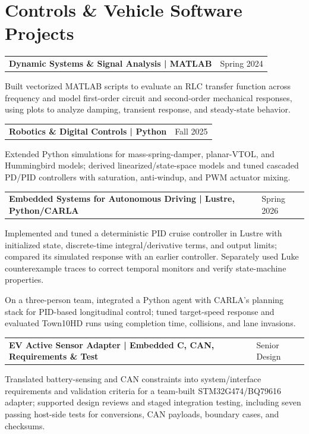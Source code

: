 \documentclass[10pt,letterpaper]{article}
\makeatletter
\newcommand{\resumeentry}[2]{%
  \begin{tabularx}{\textwidth}{@{}X>{\raggedleft\arraybackslash}p{2.40in}@{}}
    \textbf{#1} & #2
  \end{tabularx}\vspace{-0.075cm}
}
\makeatother
\begin{document}
\section{Controls \& Vehicle Software Projects}
\resumeentry{Dynamic Systems \& Signal Analysis | MATLAB}{Spring 2024}
\begin{resumebullets}
  \item Built vectorized MATLAB scripts to evaluate an RLC transfer function across frequency and model first-order circuit and second-order mechanical responses, using plots to analyze damping, transient response, and steady-state behavior.
\end{resumebullets}

\resumeentry{Robotics \& Digital Controls | Python}{Fall 2025}
\begin{resumebullets}
  \item Extended Python simulations for mass-spring-damper, planar-VTOL, and Hummingbird models; derived linearized/state-space models and tuned cascaded PD/PID controllers with saturation, anti-windup, and PWM actuator mixing.
\end{resumebullets}

\resumeentry{Embedded Systems for Autonomous Driving | Lustre, Python/CARLA}{Spring 2026}
\begin{resumebullets}
  \item Implemented and tuned a deterministic PID cruise controller in Lustre with initialized state, discrete-time integral/derivative terms, and output limits; compared its simulated response with an earlier controller. Separately used Luke counterexample traces to correct temporal monitors and verify state-machine properties.
  \item On a three-person team, integrated a Python agent with CARLA's planning stack for PID-based longitudinal control; tuned target-speed response and evaluated Town10HD runs using completion time, collisions, and lane invasions.
\end{resumebullets}

\resumeentry{EV Active Sensor Adapter | Embedded C, CAN, Requirements \& Test}{Senior Design}
\begin{resumebullets}
  \item Translated battery-sensing and CAN constraints into system/interface requirements and validation criteria for a team-built STM32G474/BQ79616 adapter; supported design reviews and staged integration testing, including seven passing host-side tests for conversions, CAN payloads, boundary cases, and checksums.
\end{resumebullets}
\end{document}

